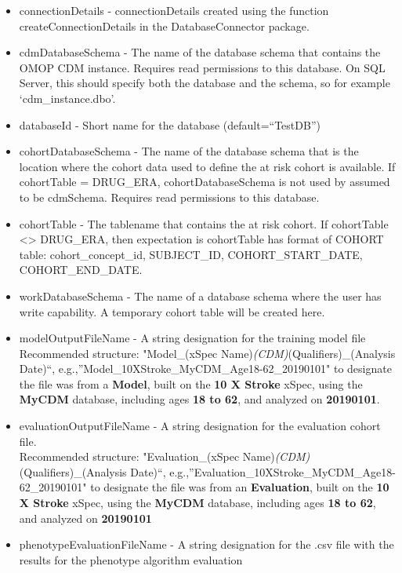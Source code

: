 \documentclass[
]{article}
\providecommand{\tightlist}{%
  \setlength{\itemsep}{0pt}\setlength{\parskip}{0pt}}
\begin{document}
\begin{itemize}
\tightlist
\item
  connectionDetails - connectionDetails created using the function
  createConnectionDetails in the DatabaseConnector package.
\item
  cdmDatabaseSchema - The name of the database schema that contains the
  OMOP CDM instance. Requires read permissions to this database. On SQL
  Server, this should specify both the database and the schema, so for
  example `cdm\_instance.dbo'.
\item
  databaseId - Short name for the database (default=``TestDB'')
\item
  cohortDatabaseSchema - The name of the database schema that is the
  location where the cohort data used to define the at risk cohort is
  available. If cohortTable = DRUG\_ERA, cohortDatabaseSchema is not
  used by assumed to be cdmSchema. Requires read permissions to this
  database.
\item
  cohortTable - The tablename that contains the at risk cohort. If
  cohortTable \textless{}\textgreater{} DRUG\_ERA, then expectation is
  cohortTable has format of COHORT table: cohort\_concept\_id,
  SUBJECT\_ID, COHORT\_START\_DATE, COHORT\_END\_DATE.
\item
  workDatabaseSchema - The name of a database schema where the user has
  write capability. A temporary cohort table will be created here.
\item
  modelOutputFileName - A string designation for the training model file
  Recommended structure: "Model\_(xSpec
  Name)\emph{(CDM)}(Qualifiers)\_(Analysis Date)``,
  e.g.,''Model\_10XStroke\_MyCDM\_Age18-62\_20190101" to designate the
  file was from a \textbf{Model}, built on the \textbf{10 X Stroke}
  xSpec, using the \textbf{MyCDM} database, including ages \textbf{18 to
  62}, and analyzed on \textbf{20190101}.
\item
  evaluationOutputFileName - A string designation for the evaluation
  cohort file.\\
  Recommended structure: "Evaluation\_(xSpec
  Name)\emph{(CDM)}(Qualifiers)\_(Analysis Date)``,
  e.g.,''Evaluation\_10XStroke\_MyCDM\_Age18-62\_20190101" to designate
  the file was from an \textbf{Evaluation}, built on the \textbf{10 X
  Stroke} xSpec, using the \textbf{MyCDM} database, including ages
  \textbf{18 to 62}, and analyzed on \textbf{20190101}
\item
  phenotypeEvaluationFileName - A string designation for the .csv file
  with the results for the phenotype algorithm evaluation

\end{itemize}
\end{document}
